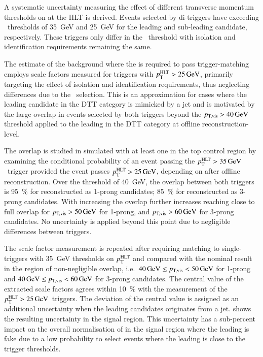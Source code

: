 A systematic uncertainty measuring the effect of different transverse
momentum thresholds on \tauhadvis at the HLT is derived.  Events
selected by di-\tauhadvis triggers have \tauhadvis exceeding
\pTHLT~thresholds of \SI{35}{\GeV} and \SI{25}{\GeV} for the leading
and sub-leading candidate, respectively. These triggers only differ in
the \pTHLT~threshold with isolation and identification requirements
remaining the same.

The estimate of the \ttbarFakes background where the \faketauhadvis is
required to pass trigger-matching employs scale factors measured for
triggers with $p_{\text{T}}^{\text{HLT}} > \SI{25}{\ensuremath{\text{GeV}}}$, primarily targeting the effect
of isolation and identification requirements, thus neglecting
differences due to the \pTHLT~selection. This is an approximation for
cases where the leading \tauhadvis candidate in the DTT category is
mimicked by a jet and is motivated by the large overlap in events
selected by both triggers beyond the $\pTvis > \SI{40}{\GeV}$
threshold applied to the leading \tauhadvis in the DTT category at
offline reconstruction-level.

The overlap is studied in simulated \ttbar with at least one
\faketauhadvis in the top control region by examining the
conditional probability of an event passing the
$p_{\text{T}}^{\text{HLT}} > \SI{35}{\ensuremath{\text{GeV}}}$~trigger provided the event passes
$p_{\text{T}}^{\text{HLT}} > \SI{25}{\ensuremath{\text{GeV}}}$, depending on \pTvis after offline \tauhadvis
reconstruction. Over the \pTvis threshold of \SI{40}{\GeV}, the
overlap between both triggers is \SI{95}{\percent} for \faketauhadvis
reconstructed as 1-prong candidates; \SI{85}{\percent} for
\faketauhadvis reconstructed as 3-prong candidates.  With
increasing \pTvis the overlap further increases reaching close to full
overlap for $p_\text{T,vis} > \SI{50}{\ensuremath{\text{GeV}}}$ for 1-prong, and
$p_\text{T,vis} > \SI{60}{\ensuremath{\text{GeV}}}$ for 3-prong candidates. No uncertainty is
applied beyond this point due to negligible differences between
triggers.

The scale factor measurement is repeated after requiring matching to
single-\tauhadvis triggers with \SI{35}{\GeV} thresholds on $p_{\text{T}}^{\text{HLT}}$
and compared with the nominal result in the region of non-negligible
overlap, i.e.\ $\SI{40}{\ensuremath{\text{GeV}}} \leq p_\text{T,vis} < \SI{50}{\ensuremath{\text{GeV}}}$ for 1-prong
and $\SI{40}{\ensuremath{\text{GeV}}} \leq p_\text{T,vis} < \SI{60}{\ensuremath{\text{GeV}}}$ for 3-prong
candidates. The central value of the extracted scale factors agrees
within \SI{10}{\percent} with the measurement of the
$p_{\text{T}}^{\text{HLT}} > \SI{25}{\ensuremath{\text{GeV}}}$~triggers. The deviation of the central value
is assigned as an additional uncertainty when the leading \tauhadvis
candidates originates from a
jet.  shows the resulting
uncertainty in the \hadhad signal region. This uncertainty has a sub-percent impact on the overall
normalisation of \ttbar in the signal region where the leading
\tauhadvis is fake due to a low probability to select events where the
leading \tauhadvis is close to the trigger thresholds.

